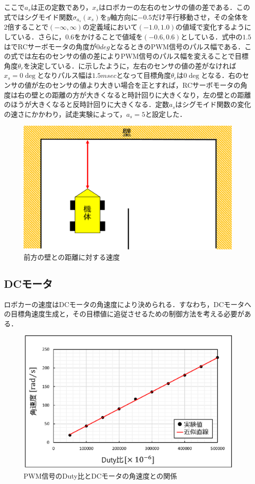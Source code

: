 \newpage
ここで$ a_{s}$は正の定数であり，$ x_{s}$はロボカーの左右のセンサの値の差である．この式ではシグモイド関数$\sigma_{a_{s}}(x_{s}) $を$y$軸方向に$-0.5$だけ平行移動させ，その全体を$2$倍することで$(-\infty,\infty)$の定義域において$(-1.0,1.0)$の値域で変化するようにしている．さらに，$0.6$をかけることで値域を$(-0.6,0.6)$としている．式中の$1.5$はでRCサーボモータの角度が$0\unit{deg}$となるときのPWM信号のパルス幅である．この式では左右のセンサの値の差によりPWM信号のパルス幅を変えることで目標角度$\theta_{r} $を決定している．に示したように，左右のセンサの値の差がなければ$x_{s}=0\unit{\deg}$となりパルス幅は$1.5\unit{msec}$となって目標角度$\theta_{r}$は$0\unit{\deg}$となる．右のセンサの値が左のセンサの値より大きい場合を正とすれば，RCサーボモータの角度は右の壁との距離の方が大きくなると時計回りに大きくなり，左の壁との距離のほうが大きくなると反時計回りに大きくなる．定数$a_{s}$はシグモイド関数の変化の速さにかかわり，試走実験によって，$a_{s}=5$と設定した．

\newpage
 \begin{figure}[htb]
  \centering
    \includegraphics[width=0.6\hsize]{picture/eps/speed_wall.eps}
  \caption{前方の壁との距離に対する速度}
  \label{fig::speed_wall}
\end{figure}
\subsection{DCモータ}
ロボカーの速度はDCモータの角速度により決められる．すなわち，DCモータへの目標角速度生成と，その目標値に追従させるための制御方法を考える必要がある．

\begin{figure}[htb]
  \centering
    \includegraphics[width=0.7\hsize]{picture/eps/duty_angvel_graph.eps}
  \caption{PWM信号のDuty比とDCモータの角速度との関係}
  \label{fig::duty_angvel_graph}
\end{figure}

